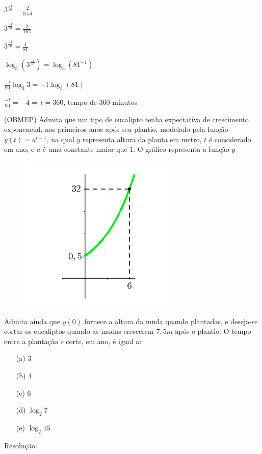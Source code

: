 \begin{multicols*}{2}
\begin{itemize}
              $3^{\frac{-t}{90}} = \frac{2}{3.54}$

              $3^{\frac{-t}{90}} = \frac{2}{162}$

              $3^{\frac{-t}{90}} = \frac{1}{81}$

              $ \log_3 \left( 3^{\frac{-t}{90}} \right) = \log_3 \left(81^{-1} \right)$

              $\frac{-t}{90} \log_3 3 = -1 \log_3 (81)$

              $\frac{-t}{90} = -4 \Rightarrow t = 360$, tempo de 360 minutos
    \end{itemize}

    (OBMEP) Admita que um tipo de eucalipto tenha expectativa de crescimento exponencial, nos 				primeiros anos após seu plantio, modelado pela função $y(t) = a^{t-1}$, na qual $y$ representa  		altura da planta em metro, $t$ é considerado em ano, e $a$  é uma constante maior que 1. O 				gráfico representa a função $y$

    \begin{figure}[H]
        \centering
        \includegraphics[scale=0.4]{assets/rafael/img23.png}
    \end{figure}
    Admita ainda que $y(0)$ fornece a altura da muda quando plantadas, e deseja-se cortar os 				eucaliptos quando as mudas crescerem $7,5m$ após o plantio. O tempo entre a plantação e corte, 			em ano, é igual a:
    \begin{itemize}
        \item[(a)] 3
        \item[(b)] 4
        \item[(c)] 6
        \item[(d)] $\log_2 7$
        \item[(e)] $\log_2 15$
    \end{itemize}
    Resolução:


\end{multicols*}
